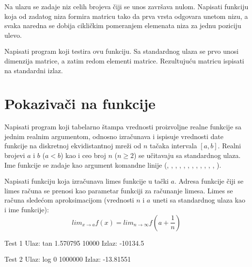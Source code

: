 \begin{Exercise}[label=344]
Na ulazu se zadaje niz celih brojeva čiji se unos završava nulom.
Napisati funkciju koja od zadatog niza formira matricu tako da
prva vrsta odgovara unetom nizu, a svaka naredna se dobija
cikličkim pomeranjem elemenata niza za jednu poziciju ulevo.

Napisati program koji testira ovu funkciju. Sa standardnog ulaza
se prvo unosi dimenzija matrice, a zatim redom elementi matrice.
Rezultujuću matricu ispisati na standardni izlaz.
\end{Exercise}
\begin{Answer}[ref=344]
\end{Answer}

\section{Pokazivači na funkcije}

\begin{Exercise}[label=345]
Napisati program koji tabelarno štampa vrednosti proizvoljne realne funkcije sa jednim realnim
argumentom, odnosno izračunava i ispisuje
vrednosti date funkcije na diskretnoj ekvidistantnoj mreži od
$n$ tačaka intervala $[a, b]$. Realni brojevi
$a$ i $b$ ($a<b$) kao i ceo broj $n$
($n \geq 2$) se učitavaju sa standardnog ulaza. Ime funkcije
se zadaje kao argument komandne linije (, , , ,
, , , , , , , , ).
\end{Exercise}
\begin{Answer}[ref=345]
\end{Answer}


\begin{Exercise}[label=346]
Napisati funkciju koja izračunava limes funkcije  u   
tački $a$. Adresa funkcije  čiji se limes računa
se prenosi kao parametar funkciji za računanje limesa.  Limes se
računa sledećom aproksimacijom (vrednosti $n$ i $a$ uneti sa
standardnog ulaza kao i ime funkcije):
$$ lim_{x \rightarrow a} f(x) = lim_{n \rightarrow \infty} f(a + \frac{1}{n})$$
\begin{miditest}
\begin{test}{Test 1}
Ulaz:   tan 1.570795 10000
Izlaz:  -10134.5
\end{test}
\end{miditest}
\begin{miditest}
\begin{test}{Test 2}
Ulaz:   log 0 1000000
Izlaz:  -13.81551
\end{test}
\end{miditest}
\end{Exercise}
\begin{Answer}[ref=346]
\end{Answer}

